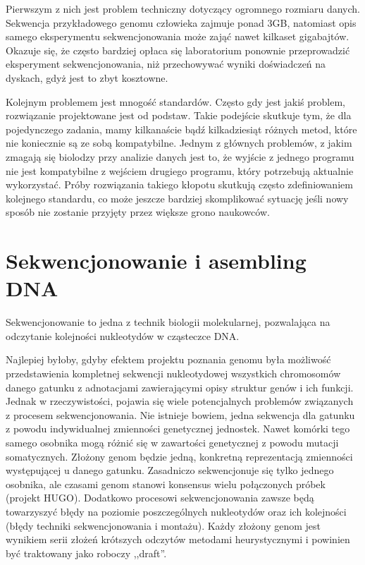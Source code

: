 Pierwszym z nich jest problem techniczny dotyczący ogromnego rozmiaru danych.
Sekwencja przykładowego genomu człowieka zajmuje ponad 3GB, natomiast opis samego eksperymentu sekwencjonowania może zająć nawet kilkaset gigabajtów. 
Okazuje się, że często bardziej opłaca się laboratorium ponownie przeprowadzić eksperyment sekwencjonowania, niż przechowywać wyniki doświadczeń na dyskach, gdyż jest to zbyt kosztowne.

Kolejnym problemem jest mnogość standardów. 
Często gdy jest jakiś problem, rozwiązanie projektowane jest od podstaw. 
Takie podejście skutkuje tym, że dla pojedynczego zadania, mamy kilkanaście bądź kilkadziesiąt różnych metod, które nie koniecznie są ze sobą kompatybilne. 
Jednym z głównych problemów, z jakim zmagają się biolodzy przy analizie danych jest to, że wyjście z jednego programu nie jest kompatybilne z wejściem drugiego programu, który potrzebują aktualnie wykorzystać. 
Próby rozwiązania takiego kłopotu skutkują często zdefiniowaniem kolejnego standardu, co może jeszcze bardziej skomplikować sytuację jeśli nowy sposób nie zostanie przyjęty przez większe grono naukowców.


\section{Sekwencjonowanie i asembling DNA}
Sekwencjonowanie to jedna z technik biologii molekularnej, pozwalająca na odczytanie kolejności nukleotydów w cząsteczce DNA.

Najlepiej byłoby, gdyby efektem projektu poznania genomu była możliwość przedstawienia kompletnej sekwencji nukleotydowej wszystkich chromosomów danego gatunku z adnotacjami zawierającymi opisy struktur genów i ich funkcji.
Jednak w rzeczywistości, pojawia się wiele potencjalnych problemów związanych z procesem sekwencjonowania. 
Nie istnieje bowiem, jedna sekwencja dla gatunku z powodu indywidualnej zmienności genetycznej jednostek. 
Nawet komórki tego samego osobnika mogą różnić się w zawartości genetycznej z powodu mutacji somatycznych. 
Złożony genom będzie jedną, konkretną reprezentacją zmienności występującej u danego gatunku. 
Zasadniczo sekwencjonuje się tylko jednego osobnika, ale czasami genom stanowi konsensus wielu połączonych próbek (projekt HUGO). 
Dodatkowo procesowi sekwencjonowania zawsze będą towarzyszyć błędy na poziomie poszczególnych nukleotydów oraz ich kolejności (błędy techniki sekwencjonowania i montażu).
Każdy złożony genom jest wynikiem serii złożeń krótszych odczytów metodami heurystycznymi i powinien być traktowany jako roboczy ,,draft''.

